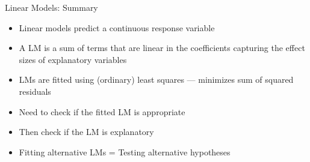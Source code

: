 \documentclass[xcolor=x11names,compress]{beamer}
\renewcommand{\(}{\begin{columns}}
\renewcommand{\)}{\end{columns}}
\newcommand{\<}[1]{\begin{column}{#1}}
\renewcommand{\>}{\end{column}}
\begin{document}

\begin{frame}{Linear Models: Summary}

    \begin{itemize}\itemsep12pt
        \item Linear models predict a continuous response variable
        \item A LM is a sum of terms that are linear in the coefficients capturing the effect sizes of explanatory variables
        \item LMs are fitted using (ordinary) least squares --- minimizes sum of squared residuals
        \item Need to check if the fitted LM is appropriate
        \item Then check if the LM is explanatory
        \item Fitting alternative LMs = Testing alternative hypotheses
    \end{itemize}
    
    \end{frame}
    
	

	
\end{document}

